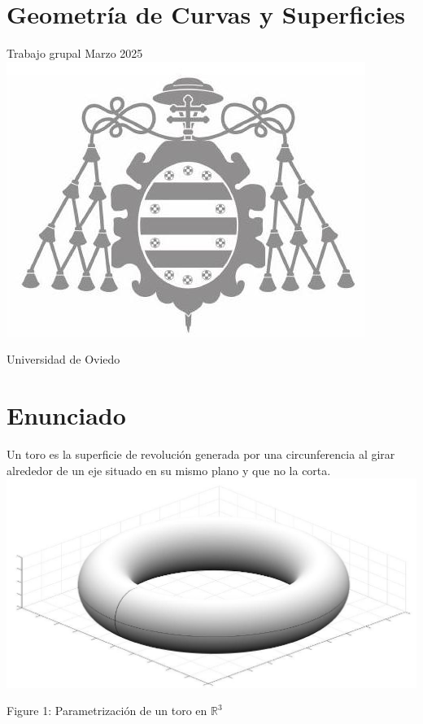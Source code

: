\documentclass[10pt]{article}
\begin{document}
\section*{Geometría de Curvas y Superficies}
Trabajo grupal Marzo 2025\\
\includegraphics[max width=\textwidth, center]{2025_03_21_0cd0f59dd73209fa5cebg-1}

Universidad de Oviedo

\section*{Enunciado}
Un toro es la superficie de revolución generada por una circunferencia al girar alrededor de un eje situado en su mismo plano y que no la corta.\\
\includegraphics[max width=\textwidth, center]{2025_03_21_0cd0f59dd73209fa5cebg-2}

Figure 1: Parametrización de un toro en $\mathbb{R}^{3}$
\end{document}
